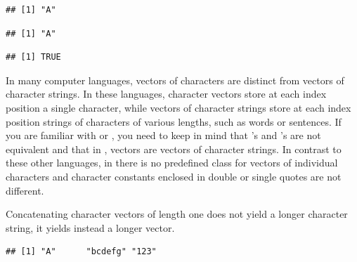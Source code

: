 \documentclass[krantz2]{krantz}\usepackage{knitr}
\begin{document}
\begin{knitrout}\footnotesize
{}\color{fgcolor}\begin{kframe}
\begin{alltt}
 \hlkwb{<-} 
\end{alltt}
\begin{verbatim}
## [1] "A"
\end{verbatim}
\begin{alltt}
 \hlkwb{<-} 
\end{alltt}
\begin{verbatim}
## [1] "A"
\end{verbatim}
\begin{alltt}
 \hlopt{==} 
\end{alltt}
\begin{verbatim}
## [1] TRUE
\end{verbatim}
\end{kframe}
\end{knitrout}

\begin{explainbox}
In many computer languages, vectors of characters are distinct from vectors of character strings. In these languages, character vectors store at each index position a single character, while vectors of character strings store at each index position strings of characters of various lengths, such as words or sentences. If you are familiar with \Clang or \Cpplang, you need to keep in mind that \Clang's  and \Rlang's  are not equivalent and that in \Rlang,  vectors are vectors of character strings. In contrast to these other languages, in \Rlang there is no predefined class for vectors of individual characters and character constants enclosed in double or single quotes are not different.
\end{explainbox}

Concatenating character vectors of length one does not yield a longer character string, it yields instead a longer vector.
\begin{knitrout}\footnotesize
{}\color{fgcolor}\begin{kframe}
\begin{alltt}
 \hlkwb{<-} 
 \hlkwb{<-} 
 \hlkwb{<-} 
 \hlkwb{<-} 
\end{alltt}
\begin{verbatim}
## [1] "A"      "bcdefg" "123"
\end{verbatim}
\end{kframe}
\end{knitrout}
\end{document}
